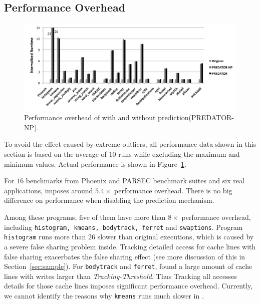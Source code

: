 \subsection{Performance Overhead}
\label{sec:perfoverhead}

\begin{figure}[ht]
\begin{center}
\includegraphics[width=6.5in]{fig/perf}
\end{center}
\caption{
Performance overhead of \Predator{} with and without prediction(PREDATOR-NP).
\label{fig:perf}}
\end{figure}

To avoid the effect caused by extreme outliers, all performance data shown in this section
is based on the average of $10$ runs while excluding the maximum and minimum values. Actual performance is shown in Figure~\ref{fig:perf}. 

For $16$ benchmarks from Phoenix and PARSEC benchmark suites and six real applications,  \Predator{} imposes around $5.4\times$ performance overhead. There is no big difference on performance when disabling the prediction mechanism. 
 
Among these programs, five of them have more than $8\times$ performance overhead, including \texttt{histogram, kmeans, bodytrack, ferret} and \texttt{swaptions}. 
Program \texttt{histogram} runs more than $26$ slower than original executions, which is caused by a severe false sharing problem inside. Tracking detailed access for cache lines with false sharing exacerbates the false sharing effect (see more discussion of this in Section~\ref{sec:sample}).  For \texttt{bodytrack} and \texttt{ferret}, \Predator{} found a large amount of cache lines with writes larger than {\it Tracking-Threshold}. Thus Tracking all accesses details for those cache lines imposes significant performance overhead. Currently, we cannot identify the reasons why \texttt{kmeans} runs much slower in \Predator{}.
   
